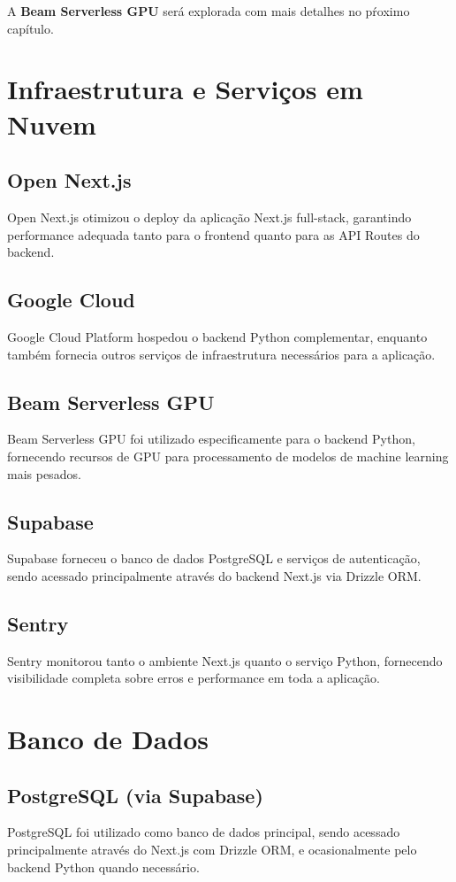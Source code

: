 \documentclass[tcc,capa]{texufpel}
\begin{document}
A \textbf{Beam Serverless GPU} será explorada com mais detalhes no pŕoximo capítulo.



\section{Infraestrutura e Serviços em Nuvem}

\subsection{Open Next.js}
Open Next.js otimizou o deploy da aplicação Next.js full-stack, garantindo performance adequada tanto para o frontend quanto para as API Routes do backend.

\subsection{Google Cloud}
Google Cloud Platform hospedou o backend Python complementar, enquanto também fornecia outros serviços de infraestrutura necessários para a aplicação.

\subsection{Beam Serverless GPU}
Beam Serverless GPU foi utilizado especificamente para o backend Python, fornecendo recursos de GPU para processamento de modelos de machine learning mais pesados.

\subsection{Supabase}
Supabase forneceu o banco de dados PostgreSQL e serviços de autenticação, sendo acessado principalmente através do backend Next.js via Drizzle ORM.

\subsection{Sentry}
Sentry monitorou tanto o ambiente Next.js quanto o serviço Python, fornecendo visibilidade completa sobre erros e performance em toda a aplicação.

\section{Banco de Dados}

\subsection{PostgreSQL (via Supabase)}
PostgreSQL foi utilizado como banco de dados principal, sendo acessado principalmente através do Next.js com Drizzle ORM, e ocasionalmente pelo backend Python quando necessário.
\end{document}
